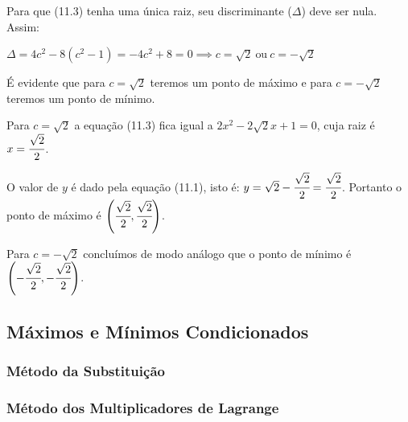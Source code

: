 		\medskip

		Para que (11.3) tenha uma única raiz, seu discriminante ($\Delta$) deve ser nula. Assim:

		\medskip

		$\Delta = 4c^{2} - 8(c^{2} -1) = -4c^{2} + 8 = 0 \implies c = \sqrt{2} \ \text{ou} \ c = - \sqrt{2}$

		\medskip

		É evidente que para $c = \sqrt{2}$ teremos um ponto de máximo e para $c = - \sqrt{2}$ teremos um ponto de mínimo.

		Para $c = \sqrt{2}$ a equação (11.3) fica igual a $2x^{2} - 2\sqrt{2}x + 1 = 0$, cuja raiz é $x = \cfrac{\sqrt{2}}{2}$.

		O valor de $y$ é dado pela equação (11.1), isto é: $y = \sqrt{2} - \cfrac{\sqrt{2}}{2} = \cfrac{\sqrt{2}}{2}$. Portanto o ponto de máximo é $\left( \cfrac{\sqrt{2}}{2}, \cfrac{\sqrt{2}}{2} \right)$.

		Para $c = - \sqrt{2}$ concluímos de modo análogo que o ponto de mínimo é $\left( - \cfrac{\sqrt{2}}{2}, - \cfrac{\sqrt{2}}{2} \right)$.
		
	\subsection{Máximos e Mínimos Condicionados \cite{morettin}}
	
		\subsubsection{Método da Substituição \cite{morettin}}

		\subsubsection{Método dos Multiplicadores de Lagrange \cite{morettin}}